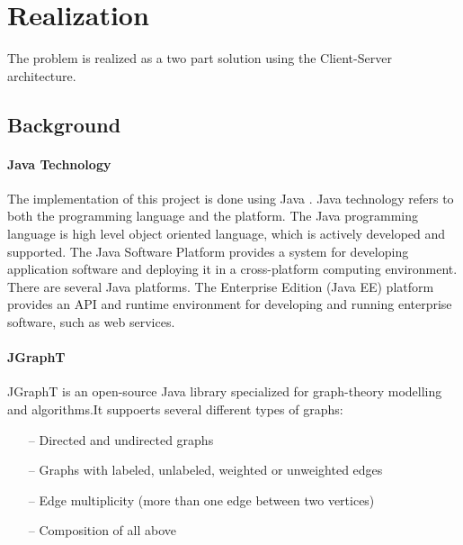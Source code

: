 \setchapterpreamble[u]%

\chapter{Realization} \label{chap:Realization}
\minitoc\vspace{1em}

The problem is realized as a two part solution using the Client-Server architecture.


\section{Background}

\subsubsection{Java Technology}
The implementation of this project is done using Java .
Java technology refers to both the programming language and the platform.
The Java programming language is high level object oriented language\cite{Gosling:2014:JLS:2636997}, 
which is actively developed and supported. 
The Java Software Platform provides a system for developing application software and deploying it in a cross-platform computing environment. 
There are several Java platforms.
The Enterprise Edition (Java EE) platform provides an API and runtime environment for developing and running enterprise software, such as web services.

\subsubsection{JGraphT}

JGraphT is an open-source Java library specialized for graph-theory modelling and algorithms.It suppoerts several different types of graphs\cite{JGraphT}:
\begin{itemize}
	\item[--] Directed and undirected graphs
	\item[--] Graphs with labeled, unlabeled, weighted or unweighted edges
	\item[--] Edge multiplicity (more than one edge between two vertices)
	\item[--] Composition of all above
\end{itemize}

